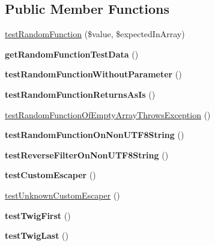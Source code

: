 \subsection*{Public Member Functions}
\begin{DoxyCompactItemize}
\item 
\hyperlink{classTwig__Tests__Extension__CoreTest_aeab6b836743764f31860973fb14e1a11}{test\+Random\+Function} (\$value, \$expected\+In\+Array)
\item 
{\bfseries get\+Random\+Function\+Test\+Data} ()\hypertarget{classTwig__Tests__Extension__CoreTest_acefd28ca6346512423ba5310951e52a8}{}\label{classTwig__Tests__Extension__CoreTest_acefd28ca6346512423ba5310951e52a8}

\item 
{\bfseries test\+Random\+Function\+Without\+Parameter} ()\hypertarget{classTwig__Tests__Extension__CoreTest_a5e3be45c43d6f6584853f60a9ea136b3}{}\label{classTwig__Tests__Extension__CoreTest_a5e3be45c43d6f6584853f60a9ea136b3}

\item 
{\bfseries test\+Random\+Function\+Returns\+As\+Is} ()\hypertarget{classTwig__Tests__Extension__CoreTest_a3d81e838c5084003026c78414630fc1c}{}\label{classTwig__Tests__Extension__CoreTest_a3d81e838c5084003026c78414630fc1c}

\item 
\hyperlink{classTwig__Tests__Extension__CoreTest_a0b72b3c3c685fd347022e39b2b6184ea}{test\+Random\+Function\+Of\+Empty\+Array\+Throws\+Exception} ()
\item 
{\bfseries test\+Random\+Function\+On\+Non\+U\+T\+F8\+String} ()\hypertarget{classTwig__Tests__Extension__CoreTest_a01a772d7ab4a0cc1c37365ca813f5dca}{}\label{classTwig__Tests__Extension__CoreTest_a01a772d7ab4a0cc1c37365ca813f5dca}

\item 
{\bfseries test\+Reverse\+Filter\+On\+Non\+U\+T\+F8\+String} ()\hypertarget{classTwig__Tests__Extension__CoreTest_a2d0d987cafc43f38ed2ee7417af92b7b}{}\label{classTwig__Tests__Extension__CoreTest_a2d0d987cafc43f38ed2ee7417af92b7b}

\item 
{\bfseries test\+Custom\+Escaper} ()\hypertarget{classTwig__Tests__Extension__CoreTest_adf595e26e4cb527d973ba04c9e6f8be5}{}\label{classTwig__Tests__Extension__CoreTest_adf595e26e4cb527d973ba04c9e6f8be5}

\item 
\hyperlink{classTwig__Tests__Extension__CoreTest_a530b224db5cbc41b53ddf15de6773d11}{test\+Unknown\+Custom\+Escaper} ()
\item 
{\bfseries test\+Twig\+First} ()\hypertarget{classTwig__Tests__Extension__CoreTest_aaab9e7946543cd56d0fbd79927156e9a}{}\label{classTwig__Tests__Extension__CoreTest_aaab9e7946543cd56d0fbd79927156e9a}

\item 
{\bfseries test\+Twig\+Last} ()\hypertarget{classTwig__Tests__Extension__CoreTest_aafbc1c86975dfe6f9588fe361d7c7c2f}{}\label{classTwig__Tests__Extension__CoreTest_aafbc1c86975dfe6f9588fe361d7c7c2f}

\end{DoxyCompactItemize}


